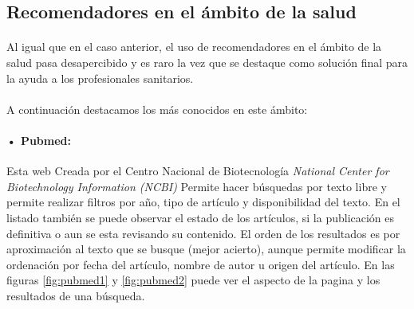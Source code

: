 \newpage
\subsection{Recomendadores en el ámbito de la salud}

\paragraph{}
Al igual que en el caso anterior, el uso de recomendadores en el ámbito de la salud pasa desapercibido y es raro la vez que se destaque como solución final para la ayuda a los profesionales sanitarios.

\paragraph{}
A continuación destacamos los más conocidos en este ámbito:

\paragraph{• Pubmed\cite{ref:pubmed_home}:}  Esta web Creada por el Centro Nacional de Biotecnología \textit{National Center for Biotechnology Information (NCBI)} Permite hacer búsquedas por texto libre y permite realizar filtros por año, tipo de artículo y disponibilidad del texto. En el listado también se puede observar el estado de los artículos, si la publicación es definitiva o aun se esta revisando su contenido. El orden de los resultados es por aproximación al texto que se busque (mejor acierto), aunque permite modificar la ordenación por fecha del artículo, nombre de autor u origen del artículo. En las figuras \ref{fig:pubmed1} y \ref{fig:pubmed2} puede ver el aspecto de la pagina y los resultados de una búsqueda.

